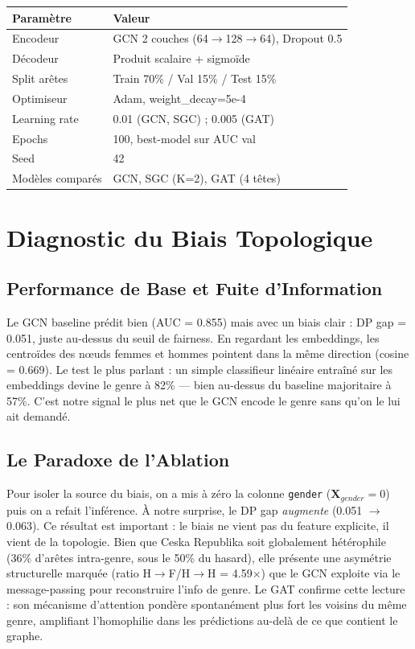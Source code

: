 \documentclass[conference, a4paper]{IEEEtran}
\begin{document}
\begin{table}[htbp]
\centering
\small
\begin{tabular}{ll}
\toprule
\textbf{Paramètre} & \textbf{Valeur} \\
\midrule
Encodeur & GCN 2 couches (64$\to$128$\to$64), Dropout 0.5 \\
Décodeur & Produit scalaire + sigmoïde \\
Split arêtes & Train 70\% / Val 15\% / Test 15\% \\
Optimiseur & Adam, weight\_decay=5e-4 \\
Learning rate & 0.01 (GCN, SGC) ; 0.005 (GAT) \\
Epochs & 100, best-model sur AUC val \\
Seed & 42 \\
Modèles comparés & GCN, SGC (K=2), GAT (4 têtes) \\
\bottomrule
\end{tabular}
\end{table}

\section{Diagnostic du Biais Topologique}

\subsection{Performance de Base et Fuite d'Information}
Le GCN baseline prédit bien (AUC = 0.855) mais avec un biais clair : DP gap = 0.051, juste au-dessus du seuil de fairness. En regardant les embeddings, les centroïdes des nœuds femmes et hommes pointent dans la même direction (cosine = 0.669). Le test le plus parlant : un simple classifieur linéaire entraîné sur les embeddings devine le genre à 82\% — bien au-dessus du baseline majoritaire à 57\%. C'est notre signal le plus net que le GCN encode le genre sans qu'on le lui ait demandé.

\subsection{Le Paradoxe de l'Ablation}
Pour isoler la source du biais, on a mis à zéro la colonne \texttt{gender} ($\mathbf{X}_{gender} = 0$) puis on a refait l'inférence. À notre surprise, le DP gap \emph{augmente} (0.051 $\to$ 0.063). Ce résultat est important : le biais ne vient pas du feature explicite, il vient de la topologie. Bien que Ceska Republika soit globalement hétérophile (36\% d'arêtes intra-genre, sous le 50\% du hasard), elle présente une asymétrie structurelle marquée (ratio H$\to$F/H$\to$H = 4.59$\times$) que le GCN exploite via le message-passing pour reconstruire l'info de genre. Le GAT confirme cette lecture : son mécanisme d'attention pondère spontanément plus fort les voisins du même genre, amplifiant l'homophilie dans les prédictions au-delà de ce que contient le graphe.
\end{document}
